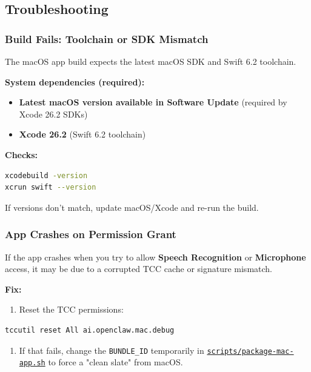 \subsection{Troubleshooting}


\subsubsection{Build Fails: Toolchain or SDK Mismatch}


The macOS app build expects the latest macOS SDK and Swift 6.2 toolchain.

\textbf{System dependencies (required):}

\begin{itemize}
  \item \textbf{Latest macOS version available in Software Update} (required by Xcode 26.2 SDKs)
  \item \textbf{Xcode 26.2} (Swift 6.2 toolchain)
\end{itemize}


\textbf{Checks:}

\begin{lstlisting}[language=bash]
xcodebuild -version
xcrun swift --version
\end{lstlisting}


If versions don’t match, update macOS/Xcode and re-run the build.

\subsubsection{App Crashes on Permission Grant}


If the app crashes when you try to allow \textbf{Speech Recognition} or \textbf{Microphone} access, it may be due to a corrupted TCC cache or signature mismatch.

\textbf{Fix:}

\begin{enumerate}
  \item Reset the TCC permissions:
\end{enumerate}


\begin{lstlisting}[language=bash]
   tccutil reset All ai.openclaw.mac.debug
\end{lstlisting}


\begin{enumerate}
  \item If that fails, change the \texttt{BUNDLE\_ID} temporarily in \href{https://github.com/openclaw/openclaw/blob/main/scripts/package-mac-app.sh}{\texttt{scripts/package-mac-app.sh}} to force a "clean slate" from macOS.
\end{enumerate}


